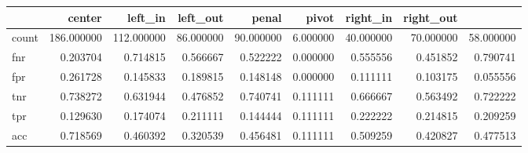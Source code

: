 \begin{tabular}{lrrrrrrrr}
\toprule
{} &      center &    left\_in &   left\_out &     penal &      pivot &   right\_in &  right\_out \\
\midrule
count &  186.000000 &  112.000000 &  86.000000 &  90.000000 &  6.000000 &  40.000000 &  70.000000 &  58.000000 \\
fnr   &    0.203704 &    0.714815 &   0.566667 &   0.522222 &  0.000000 &   0.555556 &   0.451852 &   0.790741 \\
fpr   &    0.261728 &    0.145833 &   0.189815 &   0.148148 &  0.000000 &   0.111111 &   0.103175 &   0.055556 \\
tnr   &    0.738272 &    0.631944 &   0.476852 &   0.740741 &  0.111111 &   0.666667 &   0.563492 &   0.722222 \\
tpr   &    0.129630 &    0.174074 &   0.211111 &   0.144444 &  0.111111 &   0.222222 &   0.214815 &   0.209259 \\
acc   &    0.718569 &    0.460392 &   0.320539 &   0.456481 &  0.111111 &   0.509259 &   0.420827 &   0.477513 \\
\bottomrule
\end{tabular}

